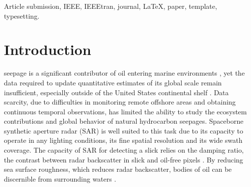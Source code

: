 \documentclass[journal]{IEEEtran}
\begin{document}
\begin{abstract}
    This document describes the most common article elements and how to use the IEEEtran class with \LaTeX \ to produce files that are suitable for submission to the IEEE.  
    IEEEtran can produce conference, journal, and technical note (correspondence) papers with a suitable choice of class options. 
    This document describes the most common article elements and how to use the IEEEtran class with \LaTeX \ to produce files that are suitable for submission to the IEEE.  
    IEEEtran can produce conference, journal, and technical note (correspondence) papers with a suitable choice of class options. 
    This document describes the most common article elements and how to use the IEEEtran class with \LaTeX \ to produce files that are suitable for submission to the IEEE.  
    IEEEtran can produce conference, journal, and technical note (correspondence) papers with a suitable choice of class options. 
    This document describes the most common article elements and how to use the IEEEtran class with \LaTeX \ to produce files that are suitable for submission to the IEEE.  
    The entirety of the data and Python code used in this study are provided in an open-access online repository.
\end{abstract}

\begin{IEEEkeywords}
    Article submission, IEEE, IEEEtran, journal, \LaTeX, paper, template, typesetting.
\end{IEEEkeywords}

\section{Introduction}
 seepage is a significant contributor of oil entering marine environments \cite{kvenvoldenNaturalSeepageCrude2003}, yet the data required to update quantitative
estimates of its global scale remain insufficient, especially outside of the United States continental shelf \cite{nationalacademiesofsciencesengineeringandmedicineOilSeaIV2022}. Data scarcity, due to difficulties 
in monitoring remote offshore areas and obtaining continuous temporal observations, has limited the ability to study the ecosystem contributions and global behavior of natural hydrocarbon seepages. 
Spaceborne synthetic aperture radar (SAR) is well suited to this task due to its capacity to operate in any lighting conditions, its fine spatial resolution and its wide swath coverage. 
The capacity of SAR for detecting a slick relies on the damping ratio, the contrast between radar backscatter in slick and oil-free pixels 
\cite{hovlandSlickDetectionSAR1994,quigleyInvestigationDampingRatio2023}. By reducing sea surface roughness, which reduces radar backscatter, bodies of oil can be discernible from surrounding waters 
\cite{brekkeSAROilSpill2020,fingasReviewOilSpill2018,alpersOilsSurfactants2004}. 
\end{document}
